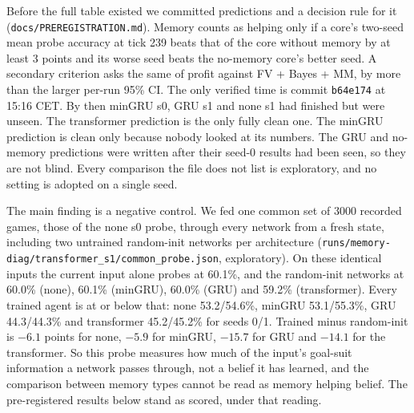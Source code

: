 \documentclass{article}
\newcommand{\file}[1]{{\small\texttt{#1}}}
\begin{document}
Before the full table existed we committed predictions and a decision rule for it (\file{docs/PREREGISTRATION.md}).
Memory counts as helping only if a core's two-seed mean probe accuracy at tick 239 beats that of the core without memory by at least 3 points and its worse seed beats the no-memory core's better seed. A secondary criterion asks the same of profit against FV + Bayes + MM, by more than the larger per-run 95\% CI.
The only verified time is commit \texttt{b64e174} at 15:16 CET. By then minGRU s0, GRU s1 and none s1 had finished but were unseen. The transformer prediction is the only fully clean one. The minGRU prediction is clean only because nobody looked at its numbers. The GRU and no-memory predictions were written after their seed-0 results had been seen, so they are not blind.
Every comparison the file does not list is exploratory, and no setting is adopted on a single seed.

\begin{table}[h]
  \centering\scriptsize\setlength{\tabcolsep}{3pt}
  \caption{Memory agents after 2000 updates. Probe at the PPO-v2 table (3000 games, 5-fold CV), profit over 1000 games per matchup. Each cell is the mean over seeds, [min--max] over seeds, and ($\pm$ mean per-run 95\% CI). Seed 2 is additional and not part of the pre-registered test, which uses seeds 0 and 1. Transformer seed 1 resumed at update 150 on another GPU after a memory kill, with the Adam state and self-play pool reset. The hand-only posterior gives 38.9\%. Files: \file{runs/memory*/<core>\_s<seed>/\{probe,eval\}.json}, table by \file{scripts/memory\_report.py}.}
  \label{tab:memory}
  
\end{table}

The main finding is a negative control. We fed one common set of 3000 recorded games, those of the none s0 probe, through every network from a fresh state, including two untrained random-init networks per architecture (\file{runs/memory-diag/transformer\_s1/common\_probe.json}, exploratory).
On these identical inputs the current input alone probes at 60.1\%, and the random-init networks at 60.0\% (none), 60.1\% (minGRU), 60.0\% (GRU) and 59.2\% (transformer). Every trained agent is at or below that: none 53.2/54.6\%, minGRU 53.1/55.3\%, GRU 44.3/44.3\% and transformer 45.2/45.2\% for seeds 0/1.
Trained minus random-init is $-6.1$ points for none, $-5.9$ for minGRU, $-15.7$ for GRU and $-14.1$ for the transformer.
So this probe measures how much of the input's goal-suit information a network passes through, not a belief it has learned, and the comparison between memory types cannot be read as memory helping belief. The pre-registered results below stand as scored, under that reading.
\end{document}
